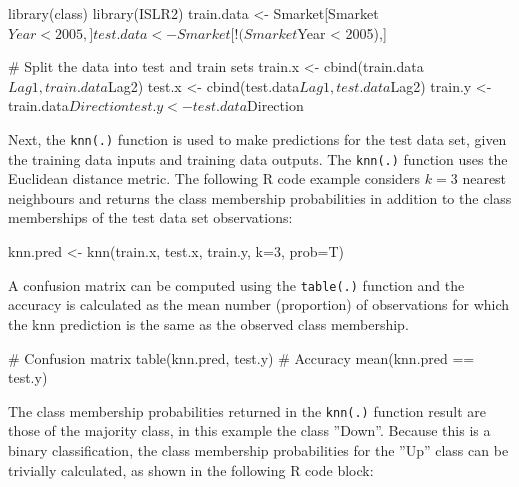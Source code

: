 \begin{samepage}
\begin{Rcode}
library(class)
library(ISLR2)
train.data <- Smarket[Smarket$Year < 2005,]
test.data <- Smarket[!(Smarket$Year < 2005),]

# Split the data into test and train sets
train.x <- cbind(train.data$Lag1, train.data$Lag2)
test.x <- cbind(test.data$Lag1, test.data$Lag2)
train.y <- train.data$Direction
test.y <- test.data$Direction
\end{Rcode}
\end{samepage}

Next, the \texttt{knn(.)} function is used to make predictions for the test data set, given the training data inputs and training data outputs. The \texttt{knn(.)} function uses the Euclidean distance metric. The following R code example considers $k=3$ nearest neighbours and returns the class membership probabilities in addition to the class memberships of the test data set observations:

\begin{Rcode}
knn.pred <- knn(train.x, test.x, train.y, k=3, prob=T)
\end{Rcode}

A confusion matrix can be computed using the \texttt{table(.)} function and the accuracy is calculated as the mean number (proportion) of observations for which the knn prediction is the same as the observed class membership.

\begin{samepage}
\begin{Rcode}
# Confusion matrix
table(knn.pred, test.y)
# Accuracy
mean(knn.pred == test.y)
\end{Rcode}
\end{samepage}

The class membership probabilities returned in the \texttt{knn(.)} function result are those of the majority class, in this example the class ''Down''. Because this is a binary classification, the class membership probabilities for the ''Up'' class can be trivially calculated, as shown in the following R code block:

\begin{samepage}
\end{samepage}

